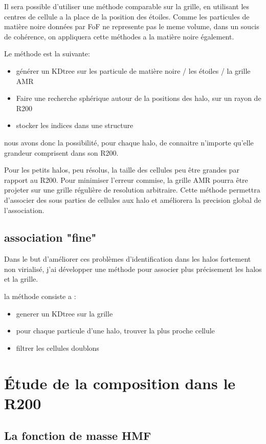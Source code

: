 Il sera possible d'utiliser une méthode comparable sur la grille, en utilisant les centres de cellule a la place de la position des étoiles.
Comme les particules de matière noire  données par FoF ne represente pas le meme volume, dans un soucis de cohérence, on appliquera cette méthodes a la matière noire également.

Le méthode est la suivante:

\begin{itemize}
\item générer un KDtree sur les particule de matière noire / les étoiles / la grille AMR
\item Faire une recherche sphérique autour de la positions des halo, sur un rayon de R200
\item stocker les indices dans une structure
\end{itemize}

nous avons donc la possibilité, pour chaque halo, de connaitre n'importe qu'elle grandeur comprisent dans son R200.


Pour les petits halos, peu résolus, la taille des cellules peu être grandes par rapport au R200.
Pour minimiser l'erreur commise, la grille AMR pourra être projeter sur une grille régulière de resolution arbitraire.
Cette méthode permettra d'associer des sous parties de cellules aux halo et améliorera la precision global de l'association.

\subsection{association "fine"}
Dans le but d'améliorer ces problèmes d'identification dans les halos fortement non virialisé, j'ai développer une méthode pour associer plus précisement les halos et la grille.


la méthode consiste a :
\begin{itemize}
\item generer un KDtree sur la grille
\item pour chaque particule d'une halo, trouver la plus proche cellule
\item filtrer les cellules doublons
\end{itemize}

\section{Étude de la composition dans le R200}


\subsection{La fonction de masse HMF}

